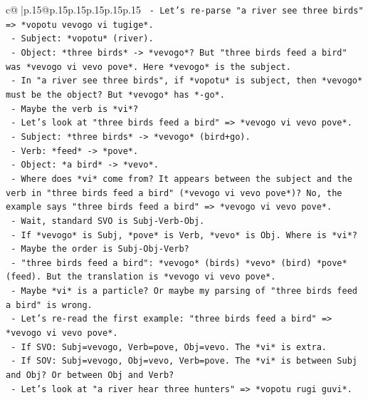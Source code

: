 \documentclass{article}
\begin{document}
{\begin{supertabular}{c@{$\;$}|p{.15\linewidth}@{}p{.15\linewidth}p{.15\linewidth}p{.15\linewidth}p{.15\linewidth}p{.15\linewidth}}
{{{\texttt{       {-} Let's re{-}parse "a river see three birds" => *vopotu vevogo vi tugige*.} \\
\texttt{         {-} Subject: *vopotu* (river).} \\
\texttt{         {-} Object: *three birds* {-}> *vevogo*? But "three birds feed a bird" was *vevogo vi vevo pove*. Here *vevogo* is the subject.} \\
\texttt{         {-} In "a river see three birds", if *vopotu* is subject, then *vevogo* must be the object? But *vevogo* has *{-}go*.} \\
\texttt{         {-} Maybe the verb is *vi*?} \\
\texttt{         {-} Let's look at "three birds feed a bird" => *vevogo vi vevo pove*.} \\
\texttt{           {-} Subject: *three birds* {-}> *vevogo* (bird+go).} \\
\texttt{           {-} Verb: *feed* {-}> *pove*.} \\
\texttt{           {-} Object: *a bird* {-}> *vevo*.} \\
\texttt{           {-} Where does *vi* come from? It appears between the subject and the verb in "three birds feed a bird" (*vevogo vi vevo pove*)? No, the example says "three birds feed a bird" => *vevogo vi vevo pove*.} \\
\texttt{           {-} Wait, standard SVO is Subj{-}Verb{-}Obj.} \\
\texttt{           {-} If *vevogo* is Subj, *pove* is Verb, *vevo* is Obj. Where is *vi*?} \\
\texttt{           {-} Maybe the order is Subj{-}Obj{-}Verb?} \\
\texttt{             {-} "three birds feed a bird": *vevogo* (birds) *vevo* (bird) *pove* (feed). But the translation is *vevogo vi vevo pove*.} \\
\texttt{             {-} Maybe *vi* is a particle? Or maybe my parsing of "three birds feed a bird" is wrong.} \\
\texttt{             {-} Let's re{-}read the first example: "three birds feed a bird" => *vevogo vi vevo pove*.} \\
\texttt{             {-} If SVO: Subj=vevogo, Verb=pove, Obj=vevo. The *vi* is extra.} \\
\texttt{             {-} If SOV: Subj=vevogo, Obj=vevo, Verb=pove. The *vi* is between Subj and Obj? Or between Obj and Verb?} \\
\texttt{             {-} Let's look at "a river hear three hunters" => *vopotu rugi guvi*.} \\
}}}
\end{supertabular}}
\end{document}
